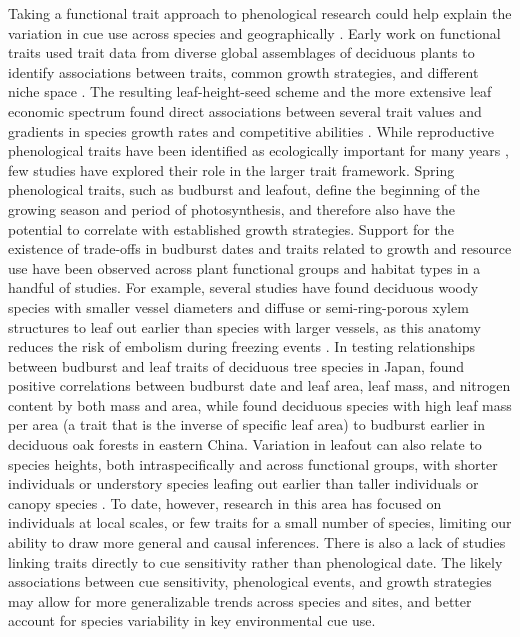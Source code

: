 \documentclass{article}\usepackage[]{graphicx}\usepackage[]{color}
\begin{document}
Taking a functional trait approach to phenological research could help explain the variation in cue use across species and geographically \citep{Flynn2018,Osada2017}. Early work on functional traits used trait data from diverse global assemblages of deciduous plants to identify associations between traits, common growth strategies, and different niche space \citep{Westoby1998,Wright2004,Chave2009}. The resulting leaf-height-seed scheme and the more extensive leaf economic spectrum found direct associations between several trait values and gradients in species growth rates and competitive abilities \citep{Westoby1998,Wright2004,Diaz2016,Chave2009,Funk2016}. While reproductive phenological traits have been identified as ecologically important for many years \citep{Weiher1999, Laughlin2014}, few studies have explored their role in the larger trait framework. Spring phenological traits, such as budburst and leafout, define the beginning of the growing season and period of photosynthesis, and therefore also have the potential to correlate with established growth strategies. Support for the existence of trade-offs in budburst dates and traits related to growth and resource use have been observed across plant functional groups and habitat types in a handful of studies. For example, several studies have found deciduous woody species with smaller vessel diameters and diffuse or semi-ring-porous xylem structures to leaf out earlier than species with larger vessels, as this anatomy reduces the risk of embolism during freezing events  \citep{Panchen2014, Lechowicz1984}. In testing relationships between budburst and leaf traits of deciduous tree species in Japan, \citep{Osada2017} found positive correlations between budburst date and leaf area, leaf mass, and nitrogen content by both mass and area, while \citep{Sun2006} found deciduous species with high leaf mass per area (a trait that is the inverse of specific leaf area) to budburst earlier in deciduous oak forests in eastern China. %
Variation in leafout can also relate to species heights, both intraspecifically and across functional groups, with shorter individuals or understory species leafing out earlier than taller individuals or canopy species \citep{Seiwa1998, 1999b}. To date, however, research in this area has focused on individuals at local scales, or few traits for a small number of species, limiting our ability to draw more general and causal inferences. There is also a lack of studies linking traits directly to cue sensitivity rather than phenological date. The likely associations between cue sensitivity, phenological events, and growth strategies may allow for more generalizable trends across species and sites, and better account for species variability in key environmental cue use. \\
\end{document}
